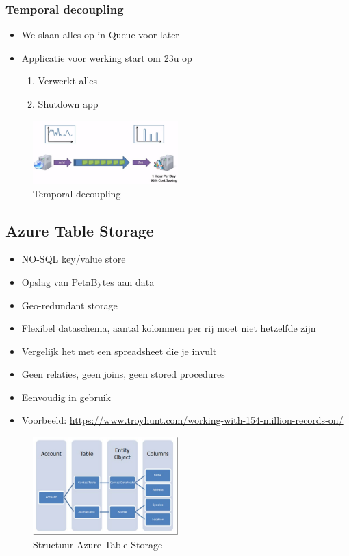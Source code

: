 \documentclass{article}
\begin{document}
\subsubsection{Temporal decoupling}

\begin{itemize}
    \item We slaan alles op in Queue voor later
    \item Applicatie voor werking start om 23u op
    \begin{enumerate}
        \item Verwerkt alles
        \item Shutdown app
    \end{enumerate}
\end{itemize}

\begin{figure}[H]
    \centering
    \includegraphics[width=0.5\textwidth]{temporal-decoupling.png}
    \caption{Temporal decoupling}
\end{figure}

\subsection{Azure Table Storage}

\begin{itemize}
    \item NO-SQL key/value store
    \item Opslag van PetaBytes aan data
    \item Geo-redundant storage
    \item Flexibel dataschema, aantal kolommen per rij moet niet hetzelfde zijn
    \item Vergelijk het met een spreadsheet die je invult
    \item Geen relaties, geen joins, geen stored procedures
    \item Eenvoudig in gebruik
    \item Voorbeeld: \url{https://www.troyhunt.com/working-with-154-million-records-on/}
\end{itemize}

\begin{figure}[H]
    \centering
    \includegraphics[width=0.5\textwidth]{azure-storage-table.png}
    \caption{Structuur Azure Table Storage}
\end{figure}
\end{document}
